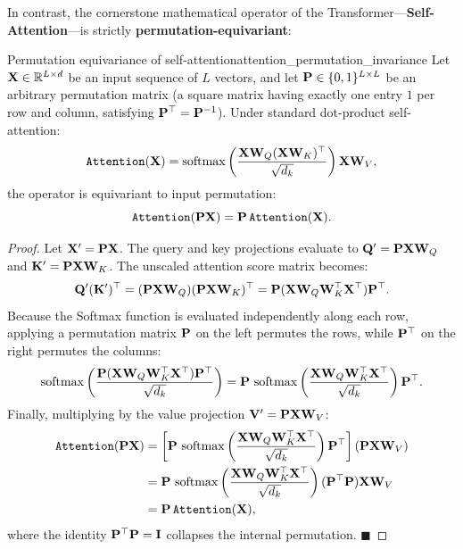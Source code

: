 \documentclass[../../main.tex]{subfiles}
\begin{document}
In contrast, the cornerstone mathematical operator of the Transformer---\textbf{Self-Attention}---is strictly \textbf{permutation-equivariant}:
\begin{theorem}{Permutation equivariance of self-attention}{attention_permutation_invariance}
Let $\mathbf{X} \in \mathbb{R}^{L \times d}$ be an input sequence of $L$ vectors, and let $\mathbf{P} \in \{0, 1\}^{L \times L}$ be an arbitrary permutation matrix (a square matrix having exactly one entry $1$ per row and column, satisfying $\mathbf{P}^\top = \mathbf{P}^{-1}$). Under standard dot-product self-attention:
\begin{equation}
\label{eq:standard_attention_op}
\text{\texttt{Attention}}(\mathbf{X}) = \operatorname{\mathrm{softmax}}\left(\frac{\mathbf{X} \mathbf{W}_Q (\mathbf{X} \mathbf{W}_K)^\top}{\sqrt{d_k}}\right) \mathbf{X} \mathbf{W}_V,
\end{equation}
the operator is equivariant to input permutation:
\begin{equation}
\label{eq:attention_permutation_proof}
\text{\texttt{Attention}}(\mathbf{P} \mathbf{X}) = \mathbf{P} \, \text{\texttt{Attention}}(\mathbf{X}).
\end{equation}
\end{theorem}
\begin{proof}
Let $\mathbf{X}' = \mathbf{P} \mathbf{X}$. The query and key projections evaluate to $\mathbf{Q}' = \mathbf{P} \mathbf{X} \mathbf{W}_Q$ and $\mathbf{K}' = \mathbf{P} \mathbf{X} \mathbf{W}_K$. The unscaled attention score matrix becomes:
\begin{equation}
\mathbf{Q}' (\mathbf{K}')^\top = (\mathbf{P} \mathbf{X} \mathbf{W}_Q) (\mathbf{P} \mathbf{X} \mathbf{W}_K)^\top = \mathbf{P} (\mathbf{X} \mathbf{W}_Q \mathbf{W}_K^\top \mathbf{X}^\top) \mathbf{P}^\top.
\end{equation}
Because the Softmax function is evaluated independently along each row, applying a permutation matrix $\mathbf{P}$ on the left permutes the rows, while $\mathbf{P}^\top$ on the right permutes the columns:
\begin{equation}
\operatorname{\mathrm{softmax}}\left(\frac{\mathbf{P} (\mathbf{X} \mathbf{W}_Q \mathbf{W}_K^\top \mathbf{X}^\top) \mathbf{P}^\top}{\sqrt{d_k}}\right) = \mathbf{P} \, \operatorname{\mathrm{softmax}}\left(\frac{\mathbf{X} \mathbf{W}_Q \mathbf{W}_K^\top \mathbf{X}^\top}{\sqrt{d_k}}\right) \mathbf{P}^\top.
\end{equation}
Finally, multiplying by the value projection $\mathbf{V}' = \mathbf{P} \mathbf{X} \mathbf{W}_V$:
\begin{align}
\text{\texttt{Attention}}(\mathbf{P} \mathbf{X}) &= \left[ \mathbf{P} \, \operatorname{\mathrm{softmax}}\left(\frac{\mathbf{X} \mathbf{W}_Q \mathbf{W}_K^\top \mathbf{X}^\top}{\sqrt{d_k}}\right) \mathbf{P}^\top \right] (\mathbf{P} \mathbf{X} \mathbf{W}_V) \nonumber \\
&= \mathbf{P} \, \operatorname{\mathrm{softmax}}\left(\frac{\mathbf{X} \mathbf{W}_Q \mathbf{W}_K^\top \mathbf{X}^\top}{\sqrt{d_k}}\right) (\mathbf{P}^\top \mathbf{P}) \mathbf{X} \mathbf{W}_V \nonumber \\
&= \mathbf{P} \, \text{\texttt{Attention}}(\mathbf{X}),
\end{align}
where the identity $\mathbf{P}^\top \mathbf{P} = \mathbf{I}$ collapses the internal permutation. $\blacksquare$
\end{proof}
\end{document}
